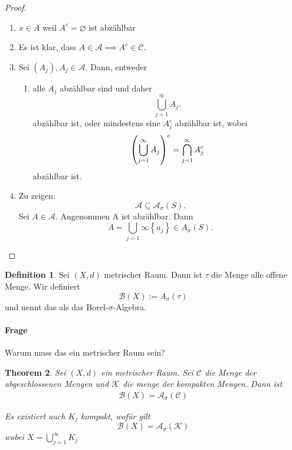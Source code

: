 \documentclass[prb,12pt]{revtex4-2}
\newtheorem{Theorem}{Theorem}
\theoremstyle{definition}
\theoremstyle{definition}
\newtheorem{Definition}[Theorem]{Definition}
\begin{document}
\begin{proof}
	\begin{enumerate}
		\item $x\in A$ weil $A^c=\varnothing$ ist abz\"{a}hlbar
		\item Es ist klar, dass $A\in \mathcal{A}\implies A^c\in\mathcal{C}$.
		\item Sei $(A_j), A_j\in \mathcal{A}$. Dann, entweder
			\begin{enumerate}
				\item alle $A_j$ abz\"{a}hlbar sind und daher
					\[
					\bigcup_{j=1} ^\infty A_j
					.\] 
					abz\"{a}hlbar ist, oder mindestens eine $A_j^c$ abz\"{a}hlbar ist, wobei
					\[
					\qty(\bigcup_{j=1} ^\infty A_j)^c=\bigcap_{j=1}^\infty A_j^c\] 
					abz\"{a}hlbar ist.
			\end{enumerate}
		\item Zu zeigen:
			\[
				\mathcal{A}\subseteq \mathcal{A}_\sigma(S)
			.\] 
			Sei $A\in \mathcal{A}$. Angenommen A ist abz\"{a}hlbar. Dann 
			\[
			A=\bigcup_{j=1} \infty \left\{ a_j \right\} \in A_\sigma(S)
			.\] 
	\end{enumerate}
\end{proof}
\begin{Definition}
	Sei $(X, d)$ metrischer Raum. Dann ist $\mathcal{\tau}$ die Menge alle offene Menge. Wir definiert
	\[
		\mathcal{B}(X):=A_\sigma(\mathcal{\tau})
	\]
	und nennt das als das Borel-$\sigma$-Algebra.
\end{Definition}
\paragraph{Frage} Warum muss das ein metrischer Raum sein?

\begin{Theorem}
	Sei $(X,d)$ ein metrischer Raum. Sei $\mathcal{C}$ die Menge der abgeschlossenen Mengen und $\mathcal{K}$ die menge der kompakten Mengen. Dann ist 
	\begin{gather*}
		\mathcal{B}(X)=\mathcal{A}_\sigma(\mathcal{C})
	\end{gather*}

	Es existiert auch $K_j$ kompakt, wof\"{u}r gilt
	\[
		\mathcal{B}(X)=\mathcal{A}_\sigma(\mathcal{K})
	\] 
	wobei $X=\bigcup_{j=1} ^\infty K_j$
\end{Theorem}
\end{document}
